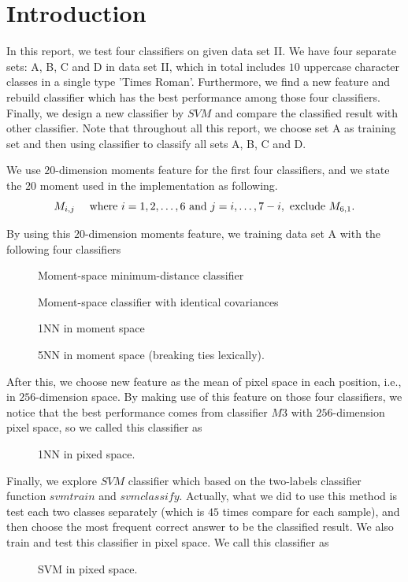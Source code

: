 \documentclass[12pt,letterpaper]{article}
\begin{document}

\section{Introduction}
In this report, we test four classifiers on given data set II. We have four separate sets: A, B, C and D in data set II, which in total includes $10$ uppercase character classes in a single type 'Times Roman'. Furthermore, we find a new feature and rebuild classifier which has the best performance among those four classifiers. Finally, we design a new classifier by $SVM$ and compare the classified result with other classifier. Note that throughout all this report, we choose set A as training set and then using classifier to classify all sets A, B, C and D.

We use $20$-dimension moments feature for the first four classifiers, and we state the $20$ moment used in the implementation as following.
\begin{equation}
M_{i,j} \quad~\mbox{where}~ i = 1,2,\dots,6~\mbox{and}~j = i,\dots,7-i, ~\mbox{exclude}~ M_{6,1}.
\end{equation}

By using this $20$-dimension moments feature, we training data set A with the following four classifiers
\begin{description}
\item[] Moment-space minimum-distance classifier
\item[] Moment-space classifier with identical covariances
\item[] 1NN in moment space
\item[] 5NN in moment space (breaking ties lexically).
\end{description}

After this, we choose new feature as the mean of pixel space in each position, i.e., in $256$-dimension space. By making use of this feature on those four classifiers, we notice that the best performance comes from classifier $M3$ with $256$-dimension pixel space, so we called this classifier as
\begin{description}
\item[] 1NN in pixed space.
\end{description}

Finally, we explore $SVM$ classifier which based on the two-labels classifier function $svmtrain$ and $svmclassify$. Actually, what we did to use this method is test each two classes separately (which is $45$ times compare for each sample), and then choose the most frequent correct answer to be the classified result. We also train and test this classifier in pixel space. We call this classifier as 
\begin{description}
\item[] SVM in pixed space.
\end{description}
\end{document}
